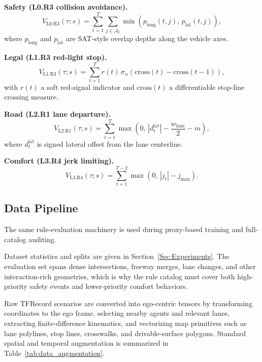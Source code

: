 \textbf{Safety (L0.R3 collision avoidance).}
\begin{equation}
V_{\text{L0.R3}}(\tau; s)=\sum_{t=1}^{T}\sum_{j\in\mathcal{A}_t}\min\!\left(p_{\text{long}}(t,j),\,p_{\text{lat}}(t,j)\right),
\end{equation}
where $p_{\text{long}}$ and $p_{\text{lat}}$ are SAT-style overlap depths along the vehicle axes.

\textbf{Legal (L1.R3 red-light stop).}
\begin{equation}
V_{\text{L1.R3}}(\tau; s)=\sum_{t=1}^{T} r(t)\,\sigma_\alpha\!\left(\mathrm{cross}(t)-\mathrm{cross}(t{-}1)\right),
\end{equation}
with $r(t)$ a soft red-signal indicator and $\mathrm{cross}(t)$ a differentiable stop-line crossing measure.

\textbf{Road (L2.R1 lane departure).}
\begin{equation}
V_{\text{L2.R1}}(\tau; s)=\sum_{t=1}^{T}\max\!\left(0,\,|d_t^{\text{lat}}|-\frac{w_{\text{lane}}}{2}-m\right),
\end{equation}
where $d_t^{\text{lat}}$ is signed lateral offset from the lane centerline.

\textbf{Comfort (L3.R4 jerk limiting).}
\begin{equation}
V_{\text{L3.R4}}(\tau; s)=\sum_{t=1}^{T-2}\max\!\left(0,\,|j_t|-j_{\max}\right).
\end{equation}

\subsection{Data Pipeline}
\label{subsec:data_pipeline}

The same rule-evaluation machinery is used during proxy-based training and full-catalog auditing.

Dataset statistics and splits are given in Section~\ref{Sec:Experiments}. The evaluation set spans dense intersections, freeway merges, lane changes, and other interaction-rich geometries, which is why the rule catalog must cover both high-priority safety events and lower-priority comfort behaviors.

Raw TFRecord scenarios are converted into ego-centric tensors by transforming coordinates to the ego frame, selecting nearby agents and relevant lanes, extracting finite-difference kinematics, and vectorizing map primitives such as lane polylines, stop lines, crosswalks, and drivable-surface polygons. Standard spatial and temporal augmentation is summarized in Table~\ref{tab:data_augmentation}.

